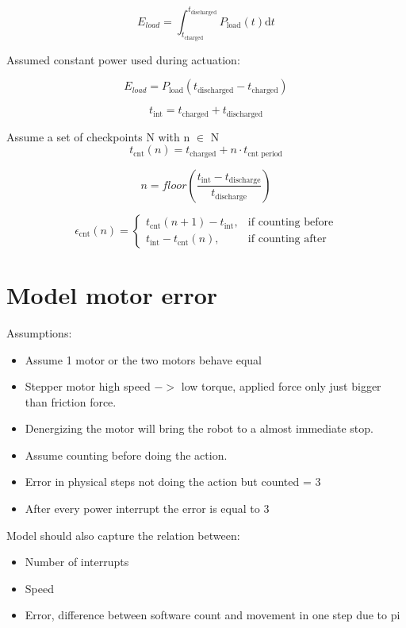 \documentclass[11pt,twoside,a4paper]{article}
\begin{document}
\begin{equation}
E_{load} = \int_{t_\text{charged}}^{t_{\text{discharged}}} P_{\text{load}}(t) \mathrm{d}t 
\end{equation}

	
Assumed constant power used during actuation:

\begin{equation}
E_{load} = P_{\text{load}}(t_{\text{discharged}} - t_{\text{charged}})
\end{equation}

\begin{equation}
t_{\text{int}} = t_{\text{charged}} + t_{\text{discharged}}
\end{equation}


Assume a set of checkpoints N with n $\in$ N \\

\begin{equation}
t_{\text{cnt}}(n) = t_{\text{charged}} + n\cdot{}t_{\text{cnt period}}
\end{equation}

\begin{equation}
n = floor(\frac{t_{\text{int}} - t_{\text{discharge}}}{t_{\text{discharge}}})
\end{equation}

\begin{equation}
\epsilon_{\text{cnt}}(n) =
    \begin{cases}
      t_{\text{cnt}}(n+1) - t_{\text{int}}, & \text{if } \text{counting before} \\
      t_{\text{int}} - t_{\text{cnt}}(n), & \text{if } \text{counting after}
    \end{cases}
\end{equation}

\newpage

\section{Model motor error}

Assumptions: \\
\begin{itemize}
\item Assume 1 motor or the two motors behave equal
\item Stepper motor high speed $->$ low torque, applied force only just bigger than friction force.
\item Denergizing the motor will bring the robot to a almost immediate stop.
\item Assume counting before doing the action.
\item Error in physical steps not doing the action but counted = 3
\item After every power interrupt the error is equal to 3
\end{itemize}


Model should also capture the relation between: \\
\begin{itemize}
\item Number of interrupts
\item Speed
\item Error, difference between software count and movement in one step due to pi
\end{itemize}
\end{document}
